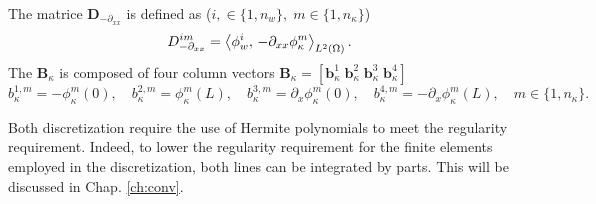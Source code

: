 The matrice $\mathbf{D}_{-\partial_{xx}}$ is defined as ($i, \in \{1, n_w\}, \; m \in \{1, n_\kappa\}$)
\begin{equation}
D_{-\partial_{xx}}^{im} = \inner[L^2(\Omega)]{\phi_w^i}{-\partial_{xx}\phi_\kappa^m}.
\end{equation}
The $\mathbf{B}_\kappa$ is composed of four column vectors $\mathbf{B}_\kappa = [\mathbf{b}_\kappa^{1} \; \mathbf{b}_\kappa^{2} \; \mathbf{b}_\kappa^3 \; \mathbf{b}_\kappa^4]$
\begin{equation}
{b}_\kappa^{1,m} = -\phi_\kappa^m(0), \quad {b}_\kappa^{2,m} = \phi_\kappa^m(L), \quad {b}_\kappa^{3,m} = \partial_x \phi_\kappa^m(0), \quad {b}_\kappa^{4,m} = -\partial_x \phi_\kappa^m(L) , \quad m \in \{1, n_\kappa\}.
\end{equation}

Both discretization require the use of Hermite polynomials to meet the regularity requirement. Indeed, to lower the regularity requirement for the finite elements employed in the discretization, both lines can be integrated by parts. This will be discussed in Chap. \ref{ch:conv}.

